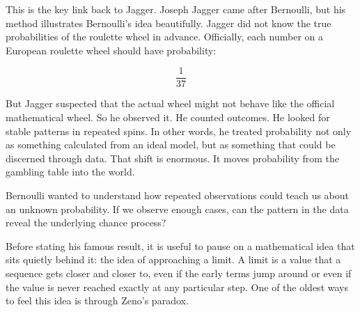\documentclass[
  letterpaper,
  DIV=11,
  numbers=noendperiod]{scrreprt}
\begin{document}
This is the key link back to Jagger. Joseph Jagger came after Bernoulli,
but his method illustrates Bernoulli's idea beautifully. Jagger did not
know the true probabilities of the roulette wheel in advance.
Officially, each number on a European roulette wheel should have
probability:

\[
\frac{1}{37}
\]

But Jagger suspected that the actual wheel might not behave like the
official mathematical wheel. So he observed it. He counted outcomes. He
looked for stable patterns in repeated spins. In other words, he treated
probability not only as something calculated from an ideal model, but as
something that could be discerned through data. That shift is enormous.
It moves probability from the gambling table into the world.

Bernoulli wanted to understand how repeated observations could teach us
about an unknown probability. If we observe enough cases, can the
pattern in the data reveal the underlying chance process?

Before stating his famous result, it is useful to pause on a
mathematical idea that sits quietly behind it: the idea of approaching a
limit. A limit is a value that a sequence gets closer and closer to,
even if the early terms jump around or even if the value is never
reached exactly at any particular step. One of the oldest ways to feel
this idea is through Zeno's paradox.
\end{document}
